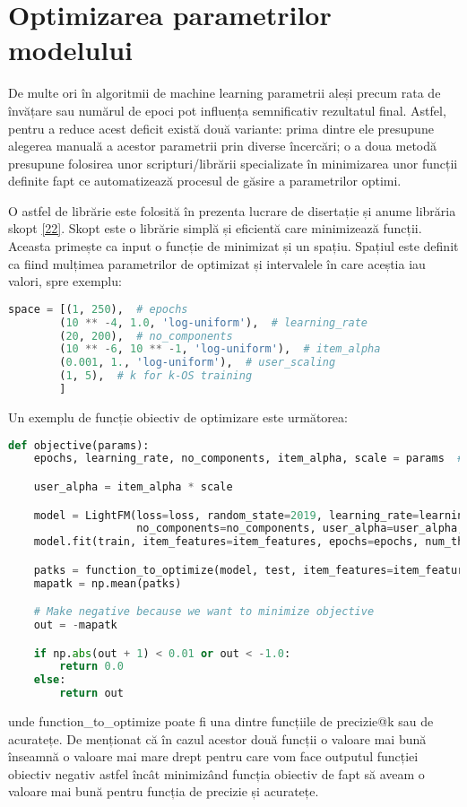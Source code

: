 \section{Optimizarea parametrilor modelului}
De multe ori în algoritmii de machine learning parametrii aleși precum rata de învățare sau numărul de epoci pot influența semnificativ rezultatul final. Astfel, pentru a reduce acest deficit există două variante: prima dintre ele presupune alegerea manuală a acestor parametrii prin diverse încercări; o a doua metodă presupune folosirea unor scripturi/librării specializate în minimizarea unor funcții definite fapt ce automatizează procesul de găsire a parametrilor optimi.

O astfel de librărie este folosită în prezenta lucrare de disertație și anume librăria skopt \hyperlink{skopt}{[22]}. Skopt este o librărie simplă și eficientă care minimizează funcții. Aceasta primește ca input o funcție de minimizat și un spațiu. Spațiul este definit ca fiind mulțimea parametrilor de optimizat și intervalele în care aceștia iau valori, spre exemplu:
\begin{lstlisting}[language=Python, caption=\textit{Spațiul parametrilor de optimizat}]
space = [(1, 250),  # epochs
        (10 ** -4, 1.0, 'log-uniform'),  # learning_rate
        (20, 200),  # no_components
        (10 ** -6, 10 ** -1, 'log-uniform'),  # item_alpha
        (0.001, 1., 'log-uniform'),  # user_scaling
        (1, 5),  # k for k-OS training
        ] 
\end{lstlisting}

Un exemplu de funcție obiectiv de optimizare este următorea:
\begin{lstlisting}[language=Python, caption=\textit{Funcția obiectiv}]
def objective(params):
    epochs, learning_rate, no_components, item_alpha, scale = params  # 'k_os'

    user_alpha = item_alpha * scale

    model = LightFM(loss=loss, random_state=2019, learning_rate=learning_rate,
                    no_components=no_components, user_alpha=user_alpha, item_alpha=item_alpha)
    model.fit(train, item_features=item_features, epochs=epochs, num_threads=threads, verbose=True)

    patks = function_to_optimize(model, test, item_features=item_features, num_threads=threads)
    mapatk = np.mean(patks)

    # Make negative because we want to minimize objective
    out = -mapatk

    if np.abs(out + 1) < 0.01 or out < -1.0:
        return 0.0
    else:
        return out
\end{lstlisting}
unde function\_to\_optimize poate fi una dintre funcțiile de precizie@k sau de acuratețe. De menționat că în cazul acestor două funcții o valoare mai bună înseamnă o valoare mai mare drept pentru care vom face outputul funcției obiectiv negativ astfel încât minimizând funcția obiectiv de fapt să aveam o valoare mai bună pentru funcția de precizie și acuratețe.

